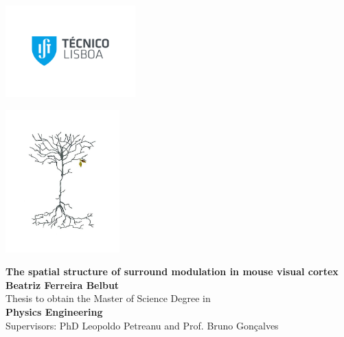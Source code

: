 \setcounter{page}{1} 


\thispagestyle{empty}
\begin{flushleft}~\\ \vspace{-12mm} \hspace{-12mm}  \includegraphics[width=50mm]{Figures/Cover/istnewlogo.pdf} 
\vspace{10mm}
\\ \begin{center} \includegraphics[height=55mm]{Figures/Cover/coverimage.jpg}  \end{center} %
 \vspace{5mm}
\centering
\LARGE \textbf{The spatial structure of surround modulation in mouse visual cortex}
\\ \vspace{10mm}
 \vspace{15mm}
\Large \textbf{Beatriz Ferreira Belbut} \\
\vspace{12mm}
\large Thesis to obtain the Master of Science Degree in
\\ \vspace{2mm}
\LARGE \textbf{Physics Engineering}
\\ \vspace{10mm}
\large Supervisors: PhD Leopoldo Petreanu and Prof. Bruno Gonçalves
\\ \vspace{15mm}
 

\end{flushleft}
